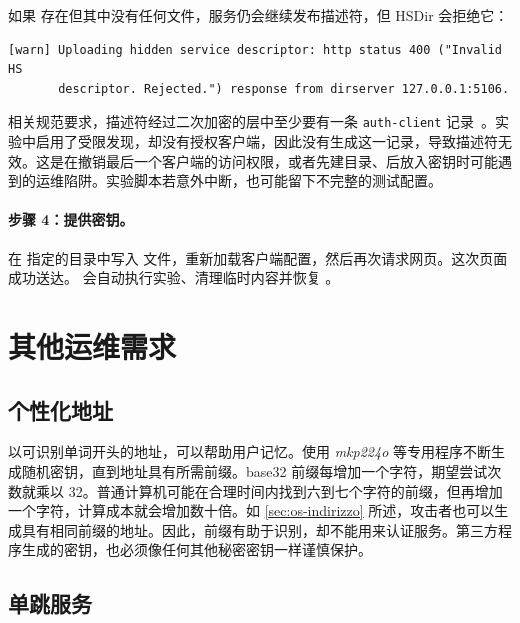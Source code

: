 \begin{attenzione}[空目录可能使服务无法访问]
如果  存在但其中没有任何文件，服务仍会继续发布描述符，但 HSDir 会拒绝它：
\begin{lstlisting}[numbers=none]
[warn] Uploading hidden service descriptor: http status 400 ("Invalid HS
       descriptor. Rejected.") response from dirserver 127.0.0.1:5106.
\end{lstlisting}
相关规范要求，描述符经过二次加密的层中至少要有一条 \texttt{auth-client} 记录~。实验中启用了受限发现，却没有授权客户端，因此没有生成这一记录，导致描述符无效。这是在撤销最后一个客户端的访问权限，或者先建目录、后放入密钥时可能遇到的运维陷阱。实验脚本若意外中断，也可能留下不完整的测试配置。
\end{attenzione}

\paragraph{步骤 4：提供密钥。}在  指定的目录中写入  文件，重新加载客户端配置，然后再次请求网页。这次页面成功送达。 会自动执行实验、清理临时内容并恢复 。

\section{其他运维需求}\label{sec:onionp-altre}

\subsection{个性化地址}

以可识别单词开头的地址，可以帮助用户记忆。使用 \emph{mkp224o} 等专用程序不断生成随机密钥，直到地址具有所需前缀。base32 前缀每增加一个字符，期望尝试次数就乘以 32。普通计算机可能在合理时间内找到六到七个字符的前缀，但再增加一个字符，计算成本就会增加数十倍。如 \cref{sec:os-indirizzo} 所述，攻击者也可以生成具有相同前缀的地址。因此，前缀有助于识别，却不能用来认证服务。第三方程序生成的密钥，也必须像任何其他秘密密钥一样谨慎保护。

\subsection{单跳服务}

